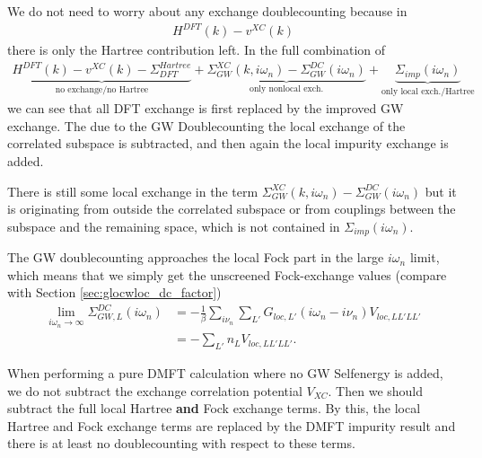 \documentclass[12pt,a4paper]{scrartcl}
\numberwithin{equation}{section}
\begin{document}
\bigskip

We do not need to worry about any exchange doublecounting because in
\begin{align}
 H^{DFT}(k) - v^{XC}(k)
\end{align}
there is only the Hartree contribution left. In the full
combination of 
\begin{align}
 \underbrace{H^{DFT}(k) - v^{XC}(k) - \Sigma^{Hartree}_{DFT}}_{\mbox{no exchange/no Hartree}}
          + \underbrace{\Sigma^{XC}_{GW}(k,i\omega_n) - \Sigma_{GW}^{DC}(i\omega_n)}_{\mbox{only nonlocal exch.}}
          + \underbrace{\Sigma_{imp}(i\omega_n)}_{\mbox{only local exch./Hartree}}
\end{align}
we can see that all DFT exchange is first replaced by the improved GW exchange.
The due to the GW Doublecounting the local exchange of the correlated subspace
is subtracted, and then again the local impurity exchange is added.

There is still some local exchange in the term 
$\Sigma^{XC}_{GW}(k,i\omega_n) - \Sigma_{GW}^{DC}(i\omega_n)$ but it is originating
from outside the correlated subspace or from couplings between the subspace and the remaining
space, which is not contained in $\Sigma_{imp}(i\omega_n)$.

The GW doublecounting approaches the local Fock part in the large $i\omega_n$ limit,
which means that we simply get the unscreened Fock-exchange 
values (compare with Section \ref{sec:glocwloc_dc_factor})
\begin{align}
\lim_{i\omega_n\rightarrow \infty} \Sigma^{DC}_{GW,L}(i\omega_n) 
&= -\frac{1}{\beta} \sum_{i\nu_n}\sum_{L'} G_{loc,L'}(i\omega_n-i\nu_n)V_{loc,LL'LL'} \\
&= - \sum_{L'} n_LV_{loc,LL'LL'} .
\end{align}


When performing a pure DMFT calculation where no GW Selfenergy is added,
we do not subtract the exchange correlation potential $V_{XC}$.
Then we should subtract the full local Hartree \textbf{and} Fock exchange terms.
By this, the local Hartree and Fock exchange terms are replaced by the DMFT impurity
result and there is at least no doublecounting with respect to these terms. 
 
\end{document}
